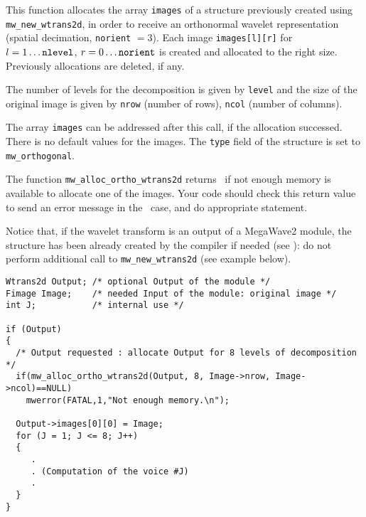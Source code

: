 \Description
This function allocates the array \verb+images+ of a \wtransdd structure previously created using \verb+mw_new_wtrans2d+, in order to receive
an orthonormal wavelet representation (spatial decimation, \verb+norient+ $=3$).
Each image \verb+images[l][r]+ for $l=1 \ldots \mbox{{\tt nlevel}}$, $r=0 \ldots \mbox{{\tt norient}}$ is created and allocated to the right size.
Previously allocations are deleted, if any.

The number of levels for the decomposition is given by \verb+level+ and the
size of the original image is given by \verb+nrow+ (number of rows), \verb+ncol+ (number of columns).

The array \verb+images+ can be addressed after this call, if the allocation successed. There is no default values for the images.
The \verb+type+ field of the \wtransdd structure is set to \verb+mw_orthogonal+.

The function \verb+mw_alloc_ortho_wtrans2d+ returns \Null\ if not enough memory is available to allocate one of the images. 
Your code should check this return value to send an error message in the \Null\ case, and do appropriate statement.

Notice that, if the wavelet transform is an output of a MegaWave2 module, the structure has been already created by the compiler if needed (see \volI): do not perform additional call to \verb+mw_new_wtrans2d+ (see example below).

\Next
\Example
\begin{verbatim}
Wtrans2d Output; /* optional Output of the module */
Fimage Image;    /* needed Input of the module: original image */
int J;           /* internal use */

if (Output) 
{
  /* Output requested : allocate Output for 8 levels of decomposition */
  if(mw_alloc_ortho_wtrans2d(Output, 8, Image->nrow, Image->ncol)==NULL)
    mwerror(FATAL,1,"Not enough memory.\n");
  
  Output->images[0][0] = Image;
  for (J = 1; J <= 8; J++)
  {
     .
     . (Computation of the voice #J)
     .
  }
}
\end{verbatim}

\newpage %

